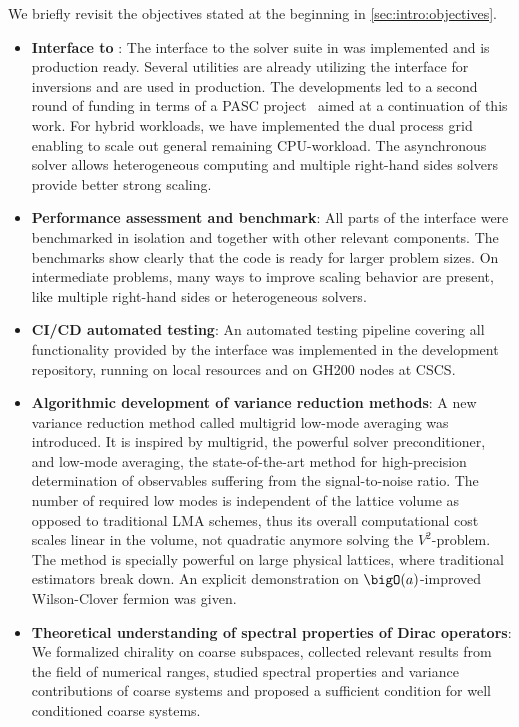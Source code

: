 We briefly revisit the objectives stated at the beginning in \cref{sec:intro:objectives}.
\begin{itemize}
   \item \textbf{Interface to \quda}: The interface to the solver suite in \quda was implemented and is production ready. Several utilities are already utilizing the interface for inversions and are used in production. The developments led to a second round of funding in terms of a PASC project~\cite{online:pasc2025} aimed at a continuation of this work. For hybrid workloads, we have implemented the dual process grid enabling to scale out general remaining CPU-workload. The asynchronous solver allows heterogeneous computing and multiple right-hand sides solvers provide better strong scaling.
   \item \textbf{Performance assessment and benchmark}: All parts of the interface were benchmarked in isolation and together with other relevant components. The benchmarks show clearly that the code is ready for larger problem sizes. On intermediate problems, many ways to improve scaling behavior are present, like multiple right-hand sides or heterogeneous solvers.
   \item \textbf{CI/CD automated testing}: An automated testing pipeline covering all functionality provided by the interface was implemented in the development repository, running on local resources and on GH200 nodes at CSCS.
   \item \textbf{Algorithmic development of variance reduction methods}: A new variance reduction method called multigrid low-mode averaging was introduced. It is inspired by multigrid, the powerful solver preconditioner, and low-mode averaging, the state-of-the-art method for high-precision determination of observables suffering from the signal-to-noise ratio. The number of required low modes is independent of the lattice volume as opposed to traditional LMA schemes, thus its overall computational cost scales linear in the volume, not quadratic anymore solving the $V^{2}$-problem. The method is specially powerful on large physical lattices, where traditional estimators break down. An explicit demonstration on $\bigO(a)$-improved Wilson-Clover fermion was given.
   \item \textbf{Theoretical understanding of spectral properties of Dirac operators}: We formalized chirality on coarse subspaces, collected relevant results from the field of numerical ranges, studied spectral properties and variance contributions of coarse systems and proposed a sufficient condition for well conditioned coarse systems.
\end{itemize}

